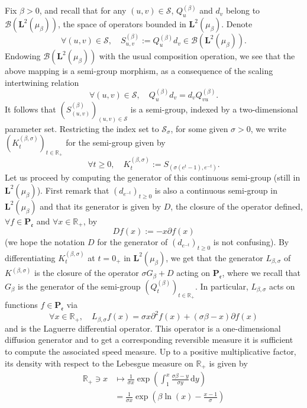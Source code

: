 \documentclass[AHL,Unicode,longabstracts]{cedram}
\newcommand{\df}{\mathrel{:=}}
\newcommand{\cB}{{\mathcal B}}
\newcommand{\cS}{{\mathcal S}}
\newcommand{\RR}{\mathbb{R}}
\newcommand{\fe}{\mathfrak{e}}
\newcommand{\lt}{\left}
\newcommand{\pa}{\partial}
\newcommand{\rt}{\right}
\newcommand{\esP}{\mathbf{P}}
\newcommand{\esL}{\mathbf{L}}
\newcommand{\esPe}{\esP_{\! \fe}}
\let\oldforall\forall
\renewcommand*{\forall}{\mathrel{\oldforall}}
\newcommand*{\dd}{\mathrm{d}}
\newcommand*{\dy}{\dd y}
\begin{document}
Fix $\beta>0$, and recall that for any $(u,v)\in\cS$, $Q^{(\beta)}_u$ and $d_v$ belong to $\cB(\esL^2(\mu_{\beta}))$, the space of operators bounded in $\esL^2(\mu_{\beta})$. Denote
\[
\forall (u,v)\in \cS,\quad S^{(\beta)}_{u,v}\df Q^{(\beta)}_ud_v \in \cB(\esL^2(\mu_{\beta})).
\]
Endowing $\cB(\esL^2(\mu_{\beta}))$ with the usual composition operation, we see that the above mapping is a semi-group morphism, as a consequence of the scaling intertwining relation
\begin{equation}\label{scal}
\forall (u,v)\in\cS,\quad Q^{(\beta)}_ud_v=d_vQ^{(\beta)}_{vu}.
\end{equation}
It follows that $(S^{(\beta)}_{(u,v)})_{(u,v)\in\cS}$ is a semi-group, indexed by a two-dimensional parameter set. Restricting the index set to $\cS_\sigma$, for some given $\sigma>0$, we write $(K^{(\beta,\sigma)}_t)_{t\in\RR_+}$ for the semi-group given by
\[
\forall t\geq 0,\quad K^{(\beta,\sigma)}_t\df S_{(\sigma(e^{t}-1),e^{-t})}.
\]
Let us proceed by computing the generator of this continuous semi-group (still in $\esL^2(\mu_{\beta})$). First remark that $(d_{e^{-t}})_{t\geq 0}$ is also a continuous semi-group in $\esL^2(\mu_{\beta})$ and that its generator is given by $D$, the closure of the operator defined, $\forall f\in \esPe$ and $\forall x\in\RR_+$, by
\begin{equation}\label{def:D}
D f(x)\df -x\pa f(x)
\end{equation}
(we hope the notation $D$ for the generator of $(d_{e^{-t}})_{t\geq 0}$ is not confusing). By differentiating $K^{(\beta,\sigma)}_t$ at $t=0_+$ in $\esL^2(\mu_{\beta})$, we get that the generator $L_{\beta,\sigma}$ of $K^{(\beta,\sigma)}$ is the closure of the operator $\sigma G_{\beta}+D$ acting on $\esPe$, where we recall that $G_{\beta}$ is the generator of the semi-group $(Q^{(\beta)}_t)_{t\in\RR_+}$. In particular, $L_{\beta,\sigma}$ acts on functions $f\in \esPe$ via
\begin{equation}\label{Lsigma}
\forall x\in\RR_+,\quad L_{\beta,\sigma}f(x)= \sigma x\pa^2f(x) +(\sigma\beta -x)\pa f(x)
\end{equation}
and is the Laguerre differential operator. This operator is a one-dimensional diffusion generator and to get a corresponding reversible measure it is sufficient to compute the associated speed measure. Up to a positive multiplicative factor, its density with respect to the Lebesgue measure on $\RR_+$ is given by
\begin{align*}
\RR_+\ni x&\mapsto \frac1{\sigma x}\exp\lt(\int_1^x \frac{\sigma\beta-y}{\sigma y}\, \dy\rt)\\
&=\frac1{\sigma x}\exp\lt(\beta \ln(x) -\frac{x-1}{\sigma }\rt)\\
\end{align*}
\end{document}
